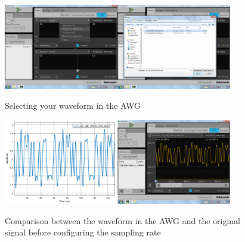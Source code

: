 \begin{figure}[h]
	\centering
	\includegraphics[width=10cm]{../mtools/sgnToWfm/figures/tutorial1}
	\label{TUT_SelectingWFM}\caption{Selecting your waveform in the AWG}
\end{figure}
\begin{figure}[h]
	\centering
	\includegraphics[width=10cm]{../mtools/sgnToWfm/figures/tutorial2}
	\label{TUT_CompBad}\caption{Comparison between the waveform in the AWG and the original signal before configuring the sampling rate}
\end{figure}

